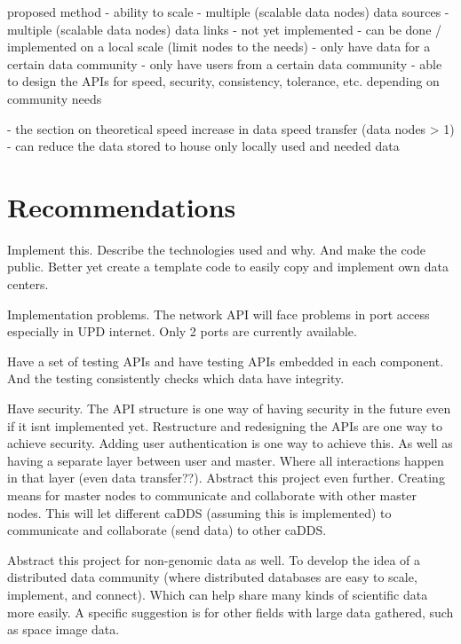 \documentclass[acmsmall]{acmart}
\begin{document}
proposed method
- ability to scale
- multiple (scalable data nodes) data sources
- multiple (scalable data nodes) data links
- not yet implemented
- can be done / implemented on a local scale (limit nodes to the needs)
- only have data for a certain data community
- only have users from a certain data community
- able to design the APIs for speed, security, consistency, tolerance, etc. depending on community needs

- the section on theoretical speed increase in data speed transfer (data nodes > 1)
- can reduce the data stored to house only locally used and needed data

\section{Recommendations}

Implement this. Describe the technologies used and why. And make the code public. Better yet create a template code to easily copy and implement own data centers.

Implementation problems. The network API will face problems in port access especially in UPD internet. Only 2 ports are currently available. 

Have a set of testing APIs and have testing APIs embedded in each component. And the testing consistently checks which data have integrity. 

Have security. The API structure is one way of having security in the future even if it isnt implemented yet. Restructure and redesigning the APIs are one way to achieve security. Adding user authentication is one way to achieve this. As well as having a separate layer between user and master. Where all interactions happen in that layer (even data transfer??). 
Abstract this project even further. Creating means for master nodes to communicate and collaborate with other master nodes. This will let different caDDS (assuming this is implemented) to communicate and collaborate (send data) to other caDDS.

Abstract this project for non-genomic data as well. To develop the idea of a distributed data community (where distributed databases are easy to scale, implement, and connect). Which can help share many kinds of scientific data more easily. A specific suggestion is for other fields with large data gathered, such as space image data.

\end{document}
